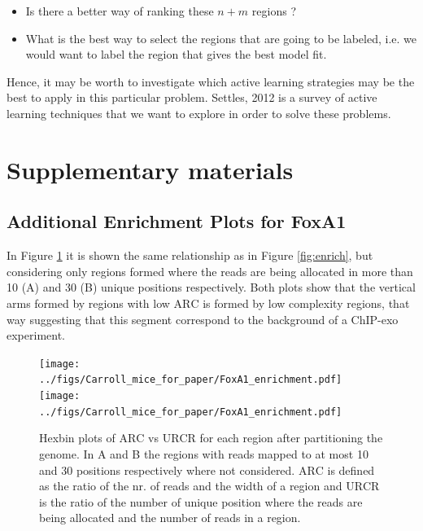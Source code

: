 \documentclass[11pt]{article}\usepackage[]{graphicx}\usepackage[]{color}
\begin{document}
\begin{itemize}
\item Is there a better way of ranking these $n+m$ regions ?
\item What is the best way to select the regions that are going to be
  labeled, i.e. we would want to label the region that gives the
  best model fit.
\end{itemize}

Hence, it may be worth to investigate which active learning strategies
may be the best to apply in this particular problem. Settles, 2012
\cite{al} is a survey of active learning techniques that we want to
explore in order to solve these problems.

\newpage


\nocite{exo_review}
\nocite{exo_gb}
\nocite{maplot1}
\nocite{maplot2}
\nocite{esl}
\nocite{anp}
\nocite{al}
\nocite{oc_review}
\nocite{exo4}

\newpage

\section*{Supplementary materials}
\label{sec:supp}

\subsection*{Additional Enrichment Plots for FoxA1}
\label{sec:enrichsup}

In Figure \ref{fig:enrich2} it is shown the same relationship as in
Figure \ref{fig:enrich}, but considering only regions formed where the
reads are being allocated in more than 10 (A) and 30 (B) unique
positions respectively. Both plots show that the vertical arms formed
by regions with low $\mbox{ARC}$ is formed by low complexity regions,
that way suggesting that this segment correspond to the background of
a ChIP-exo experiment.

\begin{figure}[h!]
  \centering
  \texttt{[image: ../figs/Carroll\_mice\_for\_paper/FoxA1\_enrichment.pdf]}
  \texttt{[image: ../figs/Carroll\_mice\_for\_paper/FoxA1\_enrichment.pdf]}
  \caption{Hexbin plots of $\mbox{ARC}$ vs $\mbox{URCR}$ for each
    region after partitioning the genome. In A and B the regions with
    reads mapped to at most 10 and 30 positions respectively where not
    considered. $\mbox{ARC}$ is defined as the ratio of the nr. of
    reads and the width of a region and $\mbox{URCR}$ is the ratio of
    the number of unique position where the reads are being allocated
    and the number of reads in a region.}
  \label{fig:enrich2}
\end{figure}
\end{document}
